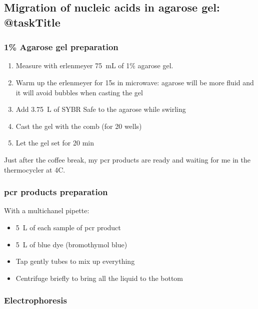 \subsection{Migration of nucleic acids in agarose gel: @taskTitle}
\label{task:@label}

\subsubsection{1\% Agarose gel preparation}

\begin{enumerate}
\item Measure with erlenmeyer 75~mL of 1\% agarose gel.
\item Warm up the erlenmeyer for 15s in microwave: agarose will be more fluid and it will avoid bubbles when casting the gel
\item Add 3.75~\textmu L of SYBR Safe to the agarose while swirling 
\item Cast the gel with the comb (for 20 wells)
\item Let the gel set for 20 min
\end{enumerate}

Just after the coffee break, my \gls{pcr} products are ready and waiting for me in the thermocycler at 4\degree C. 

\subsubsection{\gls{pcr} products preparation}

With a multichanel pipette:
\begin{itemize}
\item 5~\textmu L of each sample of \gls{pcr} product
\item 5~\textmu L of blue dye (bromothymol blue)
\item Tap gently tubes to mix up everything
\item Centrifuge briefly to bring all the liquid to the bottom
\end{itemize}

\subsubsection{Electrophoresis}

